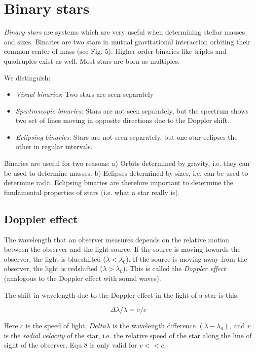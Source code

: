 \section{Binary stars}

\textit{Binary stars} are systems which are very useful when determining stellar masses and sizes. Binaries are two stars in mutual gravitational interaction orbiting their common center of mass (see Fig. 5). Higher order binaries like triples and quadruples exist as well. Most stars are born as multiples.

We distinguish:
\begin{itemize}
\item{\textit{Visual binaries}: Two stars are seen separately}
\item{\textit{Spectroscopic binaries}: Stars are not seen separately, but the spectrum shows two set of lines moving in opposite directions due to the Doppler shift.}
\item{\textit{Eclipsing binaries}: Stars are not seen separately, but one star eclipses the other in regular intervals.}
\end{itemize}

Binaries are useful for two reasons: a) Orbits determined by gravity, i.e. they can be used to determine masses. b) Eclipses determined by sizes, i.e. can be used to determine radii. Eclipsing binaries are therefore important to determine the fundamental properties of stars (i.e. what a star really is).

\subsection{Doppler effect}

The wavelength that an observer measures depends on the relative motion between the observer and the light source. If the source is moving towards the observer, the light is blueshifted ($\lambda < \lambda_0$). If the source is moving away from the observer, the light is redshifted ($\lambda >\lambda_0$). This is called the \textit{Doppler effect} (analogous to the Doppler effect with sound waves).

The shift in wavelength due to the Doppler effect in the light of a star is this:

\begin{equation}
\Delta\lambda / \lambda = v/c
\end{equation}

Here $c$ is the speed of light, $Delta\lambda$ is the wavelength difference $(\lambda - \lambda_0)$, and $v$ is the \textit{radial velocity} of the star, i.e. the relative speed of the star along the line of sight of the observer. Equ 8 is only valid for $v<<c$.

